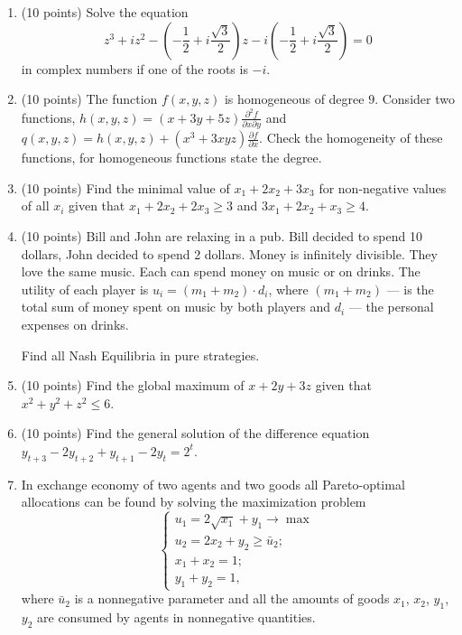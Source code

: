 \begin{enumerate}
  \item (10 points) Solve the equation
  \[
z^3 + iz^2 - \left( - \frac{1}{2}  + i\frac{\sqrt{3}}{2}  \right)z  - i\left( - \frac{1}{2}  + i\frac{\sqrt{3}}{2} \right) = 0
\]
  in complex numbers if one of the roots is $-i$.
  \item (10 points) The function $f(x, y, z)$ is homogeneous of degree $9$. Consider two functions,
  $h(x, y, z) = (x+ 3y+ 5z)\frac{\partial^2 f}{\partial x\partial y} $ and
  $q(x, y, z) = h(x,y,z) + (x^3+ 3xyz)\frac{\partial f}{\partial x}$. Check the homogeneity
  of these functions, for homogeneous functions state the degree.

 \item (10 points) Find the minimal value of $x_1 + 2x_2 + 3x_3$ for non-negative values of all $x_i$ given that $x_1 + 2x_2 + 2x_3 \geq 3$ and $3x_1 + 2x_2 + x_3 \geq 4$.

 \item (10 points) Bill and John are relaxing in a pub. Bill decided to spend 10 dollars,
 John decided to spend 2 dollars. Money is infinitely divisible.
 They love the same music. Each can spend money on music or on drinks.
 The utility of each player is $u_i = (m_1 + m_2)\cdot d_i$, where $(m_1 + m_2)$ —
 is the total sum of money spent on music by both players
 and $d_i$ — the personal expenses on drinks.

 Find all Nash Equilibria in pure strategies.

  \item (10 points) Find the global maximum of $x + 2y + 3z$ given that $x^2 + y^2 + z^2 \leq 6$.

  \item (10 points) Find the general solution of the difference equation $y_{t+3} - 2y_{t+2} + y_{t+1} - 2y_t = 2^t$.

\item In exchange economy of two agents and two goods all Pareto-optimal allocations can be found by solving the maximization problem
\[
\begin{cases}
u_1 = 2\sqrt{x_1} + y_1 \to \max \\
u_2 = 2x_2 + y_2 \geq \bar u_2; \\
x_1 + x_2 = 1; \\
y_1 + y_2 = 1,
\end{cases}
\]
where $\bar u_2$ is a nonnegative parameter and all the amounts of goods $x_1$, $x_2$, $y_1$, $y_2$ are consumed by agents in nonnegative quantities.


\end{enumerate}
